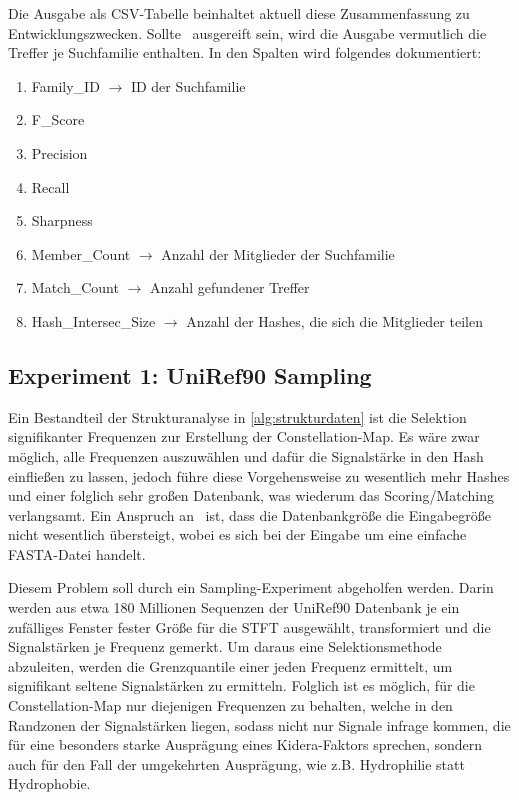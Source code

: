 \begin{enumerate}[a)]
                Die Ausgabe als \ac{CSV}-Tabelle beinhaltet aktuell diese Zusammenfassung zu Entwicklungszwecken. Sollte \protfin\ ausgereift sein, wird die Ausgabe vermutlich die Treffer je Suchfamilie enthalten. In den Spalten wird folgendes dokumentiert:
                \begin{enumerate}[1.]
                    \item Family\_ID $\rightarrow$ ID der Suchfamilie
                    \item F\_Score
                    \item Precision
                    \item Recall
                    \item Sharpness 
                    \item Member\_Count $\rightarrow$ Anzahl der Mitglieder der Suchfamilie
                    \item Match\_Count $\rightarrow$ Anzahl gefundener Treffer
                    \item Hash\_Intersec\_Size $\rightarrow$ Anzahl der Hashes, die sich die Mitglieder teilen
                \end{enumerate}
        \end{enumerate}

    \subsection{Experiment 1: UniRef90 Sampling} %
        \label{exp:uniref90}
        Ein Bestandteil der Strukturanalyse in \autoref{alg:strukturdaten} ist die Selektion signifikanter Frequenzen zur Erstellung der Constellation-Map. Es wäre zwar möglich, alle Frequenzen auszuwählen und dafür die Signalstärke in den Hash einfließen zu lassen, jedoch führe diese Vorgehensweise zu wesentlich mehr Hashes und einer folglich sehr großen Datenbank, was wiederum das Scoring/Matching verlangsamt. Ein Anspruch an \protfin\ ist, dass die Datenbankgröße die Eingabegröße nicht wesentlich übersteigt, wobei es sich bei der Eingabe um eine einfache FASTA-Datei handelt.

        Diesem Problem soll durch ein Sampling-Experiment abgeholfen werden. Darin werden aus etwa 180 Millionen Sequenzen der UniRef90 Datenbank je ein zufälliges Fenster fester Größe für die \ac{STFT} ausgewählt, transformiert und die Signalstärken je Frequenz gemerkt. Um daraus eine Selektionsmethode abzuleiten, werden die Grenzquantile einer jeden Frequenz ermittelt, um signifikant seltene Signalstärken zu ermitteln. Folglich ist es möglich, für die Constellation-Map nur diejenigen Frequenzen zu behalten, welche in den Randzonen der Signalstärken liegen, sodass nicht nur Signale infrage kommen, die für eine besonders starke Ausprägung eines Kidera-Faktors sprechen, sondern auch für den Fall der umgekehrten Ausprägung, wie z.B. Hydrophilie statt Hydrophobie.


